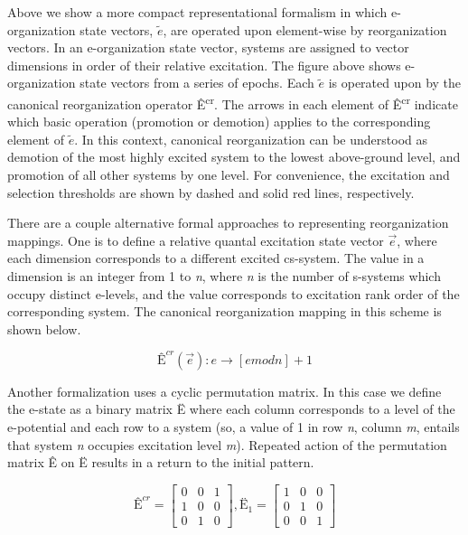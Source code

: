   Above we show a more compact representational formalism in which e-organization state vectors,  $\widetilde{{e}}$, are operated upon element-wise by reorganization vectors. In an e-organization state vector, systems are assigned to vector dimensions in order of their relative excitation. The figure above shows e-organization state vectors from a series of epochs. Each  $\widetilde{{e}}$ is operated upon by the canonical reorganization operator Ê\textsuperscript{cr}. The arrows in each element of Ê\textsuperscript{cr} indicate which basic operation (promotion or demotion) applies to the corresponding element of  $\widetilde{{e}}$. In this context, canonical reorganization can be understood as demotion of the most highly excited system to the lowest above-ground level, and promotion of all other systems by one level. For convenience, the excitation and selection thresholds are shown by dashed and solid red lines, respectively.

  There are a couple alternative formal approaches to representing reorganization mappings. One is to define a relative quantal excitation state vector  $\overrightarrow{{e}}$, where each dimension corresponds to a different excited cs-system. The value in a dimension is an integer from 1 to \textit{n}, where \textit{n} is the number of s-systems which occupy distinct e-levels, and the value corresponds to excitation rank order of the corresponding system. The canonical reorganization mapping in this scheme is shown below.

\begin{equation*}
{\text{Ê}}^{\mathit{cr}}\left(\overrightarrow{{e}}\right):e\rightarrow \left[e\mathit{mod}n\right]+1
\end{equation*}

  Another formalization uses a cyclic permutation matrix. In this case we define the e-state as a binary matrix Ë where each column corresponds to a level of the e-potential and each row to a system (so, a value of 1 in row \textit{n}, column \textit{m}, entails that system \textit{n} occupies excitation level \textit{m}). Repeated action of the permutation matrix Ê on Ë results in a return to the initial pattern. 

\begin{equation*}
{\text{Ê}}^{\mathit{cr}}=\left[\begin{matrix}0 & 0 & 1\\
1 & 0 & 0\\
0 & 1 & 0\end{matrix}\right],{\text{Ë}}_{1}=\left[\begin{matrix}1 & 0 & 0\\
0 & 1 & 0\\
0 & 0 & 1\end{matrix}\right]
\end{equation*}

